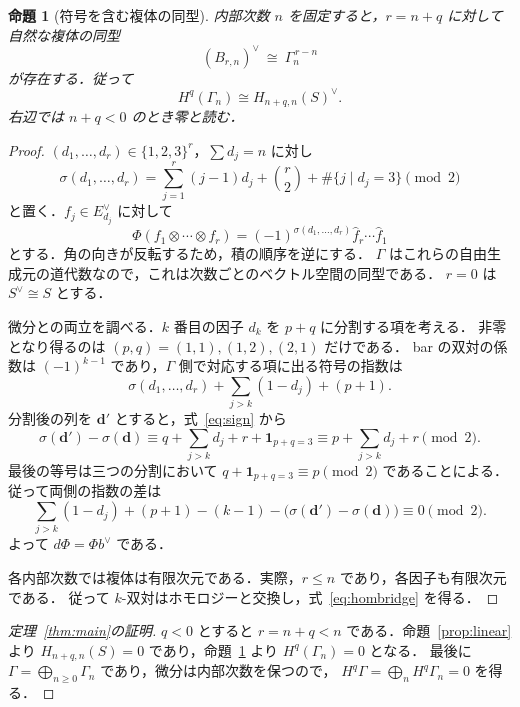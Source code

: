 \documentclass[a4paper,11pt]{ltjsarticle}
\newtheorem{proposition}[theorem]{命題}
\theoremstyle{definition}
\newcommand{\dual}{^{\vee}}
\begin{document}
\begin{proposition}[符号を含む複体の同型]\label{prop:bridge}
内部次数 $n$ を固定すると，$r=n+q$ に対して自然な複体の同型
\begin{equation}\label{eq:bridge}
 (B_{r,n})\dual\ \cong\ \Gamma_n^{\,r-n}
\end{equation}
が存在する．従って
\begin{equation}\label{eq:hombridge}
 H^q(\Gamma_n)\cong
 H_{n+q,n}(S)\dual.
\end{equation}
右辺では $n+q<0$ のとき零と読む．
\end{proposition}
\begin{proof}
$(d_1,\ldots,d_r)\in\{1,2,3\}^r$，$\sum d_j=n$ に対し
\begin{equation}\label{eq:sign}
 \sigma(d_1,\ldots,d_r)
 =\sum_{j=1}^r(j-1)d_j+\binom r2+\#\{j\mid d_j=3\}\pmod2
\end{equation}
と置く．$f_j\in E_{d_j}\dual$ に対して
\begin{equation}\label{eq:phi}
 \Phi(f_1\otimes\cdots\otimes f_r)
 =(-1)^{\sigma(d_1,\ldots,d_r)}\widehat f_r\cdots\widehat f_1
\end{equation}
とする．角の向きが反転するため，積の順序を逆にする．
$\Gamma$ はこれらの自由生成元の道代数なので，これは次数ごとのベクトル空間の同型である．
$r=0$ は $S\dual\cong S$ とする．

微分との両立を調べる．$k$ 番目の因子 $d_k$ を $p+q$ に分割する項を考える．
非零となり得るのは $(p,q)=(1,1),(1,2),(2,1)$ だけである．
bar の双対の係数は $(-1)^{k-1}$ であり，$\Gamma$ 側で対応する項に出る符号の指数は
\[
 \sigma(d_1,\ldots,d_r)+
 \sum_{j>k}(1-d_j)+(p+1).
\]
分割後の列を $\boldsymbol d'$ とすると，式~\eqref{eq:sign} から
\[
 \sigma(\boldsymbol d')-\sigma(\boldsymbol d)
 \equiv q+\sum_{j>k}d_j+r+\mathbf1_{p+q=3}
 \equiv p+\sum_{j>k}d_j+r\pmod2.
\]
最後の等号は三つの分割において
$q+\mathbf1_{p+q=3}\equiv p\pmod2$ であることによる．
従って両側の指数の差は
\[
 \sum_{j>k}(1-d_j)+(p+1)-(k-1)
 -\bigl(\sigma(\boldsymbol d')-\sigma(\boldsymbol d)\bigr)
 \equiv0\pmod2.
\]
よって $d\Phi=\Phi b\dual$ である．

各内部次数では複体は有限次元である．実際，$r\le n$ であり，各因子も有限次元である．
従って $k$-双対はホモロジーと交換し，式~\eqref{eq:hombridge} を得る．
\end{proof}

\begin{proof}[定理~\ref{thm:main}の証明]
$q<0$ とすると $r=n+q<n$ である．命題~\ref{prop:linear} より
$H_{n+q,n}(S)=0$ であり，命題~\ref{prop:bridge} より $H^q(\Gamma_n)=0$ となる．
最後に $\Gamma=\bigoplus_{n\ge0}\Gamma_n$ であり，微分は内部次数を保つので，
$H^q\Gamma=\bigoplus_nH^q\Gamma_n=0$ を得る．
\end{proof}
\end{document}
